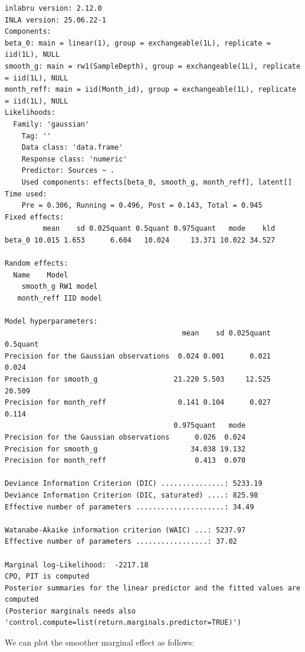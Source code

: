 \documentclass[
  letterpaper,
  DIV=11,
  numbers=noendperiod]{scrartcl}
\newenvironment{Shaded}{\begin{snugshade}}{\end{snugshade}}
\newcommand{\AttributeTok}[1]{\textcolor[rgb]{0.40,0.45,0.13}{#1}}
\newcommand{\FloatTok}[1]{\textcolor[rgb]{0.68,0.00,0.00}{#1}}
\newcommand{\FunctionTok}[1]{\textcolor[rgb]{0.28,0.35,0.67}{#1}}
\newcommand{\NormalTok}[1]{\textcolor[rgb]{0.00,0.23,0.31}{#1}}
\newcommand{\SpecialCharTok}[1]{\textcolor[rgb]{0.37,0.37,0.37}{#1}}
\newcommand{\StringTok}[1]{\textcolor[rgb]{0.13,0.47,0.30}{#1}}
\begin{document}
\begin{verbatim}
inlabru version: 2.12.0
INLA version: 25.06.22-1
Components:
beta_0: main = linear(1), group = exchangeable(1L), replicate = iid(1L), NULL
smooth_g: main = rw1(SampleDepth), group = exchangeable(1L), replicate = iid(1L), NULL
month_reff: main = iid(Month_id), group = exchangeable(1L), replicate = iid(1L), NULL
Likelihoods:
  Family: 'gaussian'
    Tag: ''
    Data class: 'data.frame'
    Response class: 'numeric'
    Predictor: Sources ~ .
    Used components: effects[beta_0, smooth_g, month_reff], latent[]
Time used:
    Pre = 0.306, Running = 0.496, Post = 0.143, Total = 0.945 
Fixed effects:
         mean    sd 0.025quant 0.5quant 0.975quant   mode    kld
beta_0 10.015 1.653      6.604   10.024     13.371 10.022 34.527

Random effects:
  Name    Model
    smooth_g RW1 model
   month_reff IID model

Model hyperparameters:
                                          mean    sd 0.025quant 0.5quant
Precision for the Gaussian observations  0.024 0.001      0.021    0.024
Precision for smooth_g                  21.220 5.503     12.525   20.509
Precision for month_reff                 0.141 0.104      0.027    0.114
                                        0.975quant   mode
Precision for the Gaussian observations      0.026  0.024
Precision for smooth_g                      34.038 19.132
Precision for month_reff                     0.413  0.070

Deviance Information Criterion (DIC) ...............: 5233.19
Deviance Information Criterion (DIC, saturated) ....: 825.98
Effective number of parameters .....................: 34.49

Watanabe-Akaike information criterion (WAIC) ...: 5237.97
Effective number of parameters .................: 37.02

Marginal log-Likelihood:  -2217.18 
CPO, PIT is computed 
Posterior summaries for the linear predictor and the fitted values are computed
(Posterior marginals needs also 'control.compute=list(return.marginals.predictor=TRUE)')
\end{verbatim}

We can plot the smoother marginal effect as follows:

\begin{Shaded}
\end{Shaded}
\end{document}
